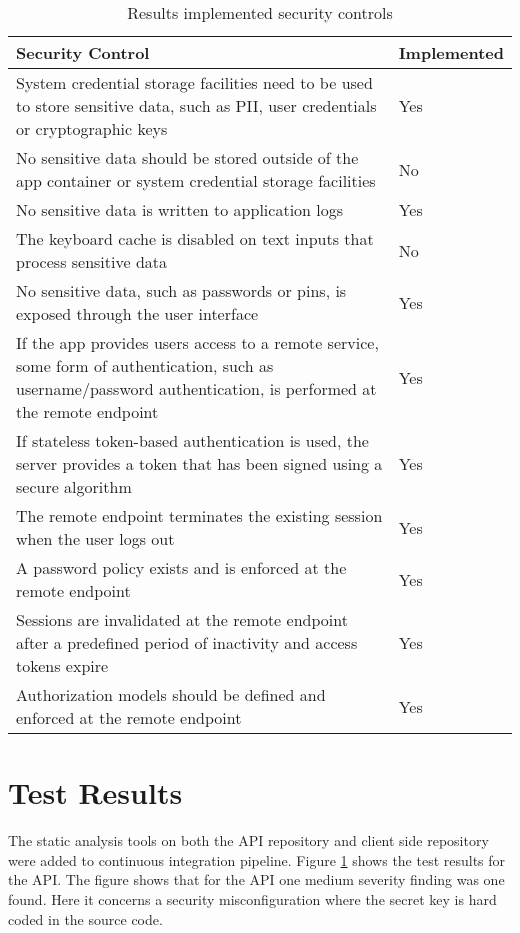 \begin{table}[!b]
    \centering
    \caption{Results implemented security controls}
    \label{tab:results-implemented}
    \begin{tabulary}{1.0\textwidth}{|L|l|}
        \hline
        \textbf{Security Control} & \textbf{Implemented} \\
        \hline
        System credential storage facilities need to be used to store sensitive data, such as PII, user credentials or cryptographic keys & Yes \\
        \hline
        No sensitive data should be stored outside of the app container or system credential storage facilities & No \\
        \hline
        No sensitive data is written to application logs & Yes \\
        \hline
        The keyboard cache is disabled on text inputs that process sensitive data & No \\
        \hline
        No sensitive data, such as passwords or pins, is exposed through the user interface & Yes \\
        \hline
        If the app provides users access to a remote service, some form of authentication, such as username/password authentication, is performed at the remote endpoint & Yes \\
        \hline
        If stateless token-based authentication is used, the server provides a token that has been signed using a secure algorithm & Yes \\
        \hline
        The remote endpoint terminates the existing session when the user logs out & Yes \\
        \hline
        A password policy exists and is enforced at the remote endpoint & Yes \\
        \hline
        Sessions are invalidated at the remote endpoint after a predefined period of inactivity and access tokens expire & Yes \\
        \hline
        Authorization models should be defined and enforced at the remote endpoint & Yes \\
        \hline
    \end{tabulary}
\end{table}

\section{Test Results}
The static analysis tools on both the API repository and client side repository were added to continuous integration pipeline. Figure \ref{} shows the test results for the API. The figure shows that for the API one medium severity finding was one found. Here it concerns a security misconfiguration where the secret key is hard coded in the source code.

